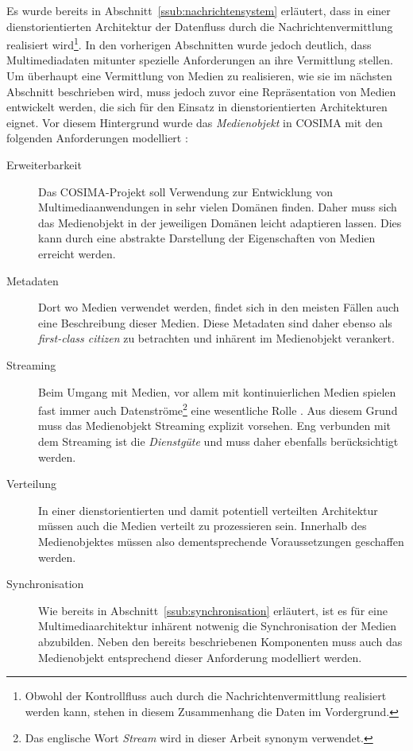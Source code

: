   Es wurde bereits in Abschnitt~\ref{ssub:nachrichtensystem} erläutert, dass in einer dienstorientierten Architektur der Datenfluss durch die Nachrichtenvermittlung realisiert wird\footnote{Obwohl der Kontrollfluss auch durch die Nachrichtenvermittlung realisiert werden kann, stehen in diesem Zusammenhang die Daten im Vordergrund.}. In den vorherigen Abschnitten wurde jedoch deutlich, dass Multimediadaten mitunter spezielle Anforderungen an ihre Vermittlung stellen. Um überhaupt eine Vermittlung von Medien zu realisieren, wie sie im nächsten Abschnitt beschrieben wird, muss jedoch zuvor eine Repräsentation von Medien entwickelt werden, die sich für den Einsatz in dienstorientierten Architekturen eignet. Vor diesem Hintergrund wurde das \emph{Medienobjekt} in COSIMA mit den folgenden Anforderungen modelliert \citep[S. 34]{bericht}:
  
  \begin{description}
    \item[Erweiterbarkeit] Das COSIMA-Projekt soll Verwendung zur Entwicklung von Multimediaanwendungen in sehr vielen Domänen finden. Daher muss sich das Medienobjekt in der jeweiligen Domänen leicht adaptieren lassen. Dies kann durch eine abstrakte Darstellung der Eigenschaften von Medien erreicht werden.
    \item[Metadaten] Dort wo Medien verwendet werden, findet sich in den meisten Fällen auch eine Beschreibung dieser Medien. Diese Metadaten sind daher ebenso als \emph{first-class citizen} zu betrachten und inhärent im Medienobjekt verankert.
    \item[Streaming] Beim Umgang mit Medien, vor allem mit kontinuierlichen Medien spielen fast immer auch Datenströme\footnote{Das englische Wort \emph{Stream} wird in dieser Arbeit synonym verwendet.} eine wesentliche Rolle \citep[S. 14ff]{multimedia_technologie}. Aus diesem Grund muss das Medienobjekt Streaming explizit vorsehen. Eng verbunden mit dem Streaming ist die \emph{Dienstgüte} \citep{multimedia_technologie} und muss daher ebenfalls berücksichtigt werden.
    \item[Verteilung] In einer dienstorientierten und damit potentiell verteilten Architektur müssen auch die Medien verteilt zu prozessieren sein. Innerhalb des Medienobjektes müssen also dementsprechende Voraussetzungen geschaffen werden.
    \item[Synchronisation] Wie bereits in Abschnitt~\ref{ssub:synchronisation} erläutert, ist es für eine Multimediaarchitektur inhärent notwenig die Synchronisation der Medien abzubilden. Neben den bereits beschriebenen Komponenten muss auch das Medienobjekt entsprechend dieser Anforderung modelliert werden.
  \end{description}

